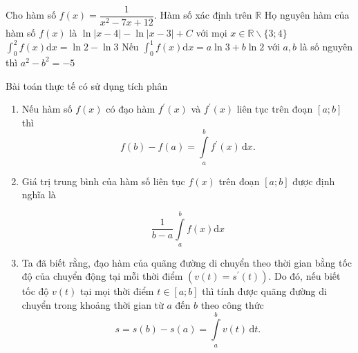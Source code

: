 \begin{ex}
	Cho hàm số $f(x)=\dfrac{1}{x^2-7 x+12}$.
	\choiceTF
	{Hàm số xác định trên $\mathbb{R}$}
	{\True Họ nguyên hàm của hàm số $f(x)$ là $\ln |x-4|-\ln |x-3|+C$ với mọi $x \in \mathbb{R} \backslash\{3 ; 4\}$}
	{$\displaystyle\int_0^2 f(x) \mathrm{d} x=\ln 2-\ln 3$}
	{\True Nếu $\displaystyle\int_0^1 f(x) \mathrm{d} x=a \ln 3+b \ln 2$ với $a, b$ là số nguyên thì $a^2-b^2=-5$}
\end{ex}
\begin{dang}{Bài toán thực tế có sử dụng tích phân}
	\begin{enumerate}[1.]
		\item  Nếu hàm số $f(x)$ có đạo hàm $f^{\prime}(x)$ và $f^{\prime}(x)$ liên tục trên đoạn $[a; b]$ thì
		$$f(b)-f(a)=\displaystyle\int\limits_a^b f^{\prime}(x) \mathrm{\,d}x.$$
		\item Giá trị trung bình của hàm số liên tục $f(x)$ trên đoạn $[a ; b]$ được định nghĩa là
		
		$$
		\dfrac{1}{b-a} \displaystyle\int\limits_{a}^{b} f(x) \mathrm{d} x
		$$
		\item Ta đã biết rằng, đạo hàm của quãng đường di chuyển theo thời gian bằng tốc độ của chuyển động tại mỗi thời điểm $\left(v(t)=s^{\prime}(t)\right)$. Do đó, nếu biết tốc độ $v(t)$ tại mọi thời điểm $t \in[a; b]$ thì tính được quãng đường di chuyển trong khoảng thời gian từ $a$ đến $b$ theo công thức
		$$
		s=s(b)-s(a)=\displaystyle\int\limits_a^b v(t) \mathrm{\,d}t.
		$$
	\end{enumerate}
\end{dang}
\setcounter{vd}{0}

